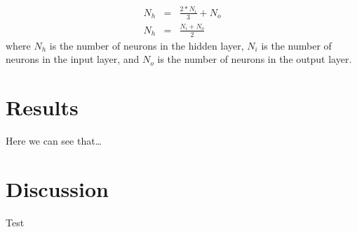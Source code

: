 \documentclass{article}
\begin{document}
\begin{eqnarray}
    N_h & = & \frac{2 * N_i}{3} + N_o\\
    N_h & = & \frac{N_i + N_o}{2}
\end{eqnarray}
where $N_h$ is the number of neurons in the hidden layer, $N_i$ is the number of neurons in the input
layer, and $N_o$ is the number of neurons in the output layer.

\section{Results}
Here we can see that\ldots

\section{Discussion}
Test

\printbibliography
\end{document}
